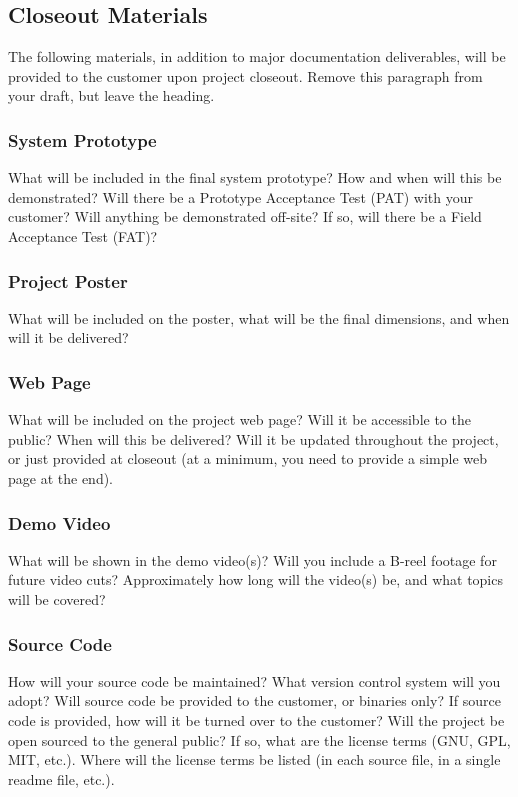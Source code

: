 \subsection{Closeout Materials}
The following materials, in addition to major documentation deliverables, will be provided to the customer upon project closeout. Remove this paragraph from your draft, but leave the heading.

\subsubsection{System Prototype}
What will be included in the final system prototype? How and when will this be demonstrated? Will there be a Prototype Acceptance Test (PAT) with your customer? Will anything be demonstrated off-site? If so, will there be a Field Acceptance Test (FAT)?

\subsubsection{Project Poster}
What will be included on the poster, what will be the final dimensions, and when will it be delivered?

\subsubsection{Web Page}
What will be included on the project web page? Will it be accessible to the public? When will this be delivered? Will it be updated throughout the project, or just provided at closeout (at a minimum, you need to provide a simple web page at the end).

\subsubsection{Demo Video}
What will be shown in the demo video(s)? Will you include a B-reel footage for future video cuts? Approximately how long will the video(s) be, and what topics will be covered?

\subsubsection{Source Code}
How will your source code be maintained? What version control system will you adopt? Will source code be provided to the customer, or binaries only? If source code is provided, how will it be turned over to the customer? Will the project be open sourced to the general public? If so, what are the license terms (GNU, GPL, MIT, etc.). Where will the license terms be listed (in each source file, in a single readme file, etc.).

